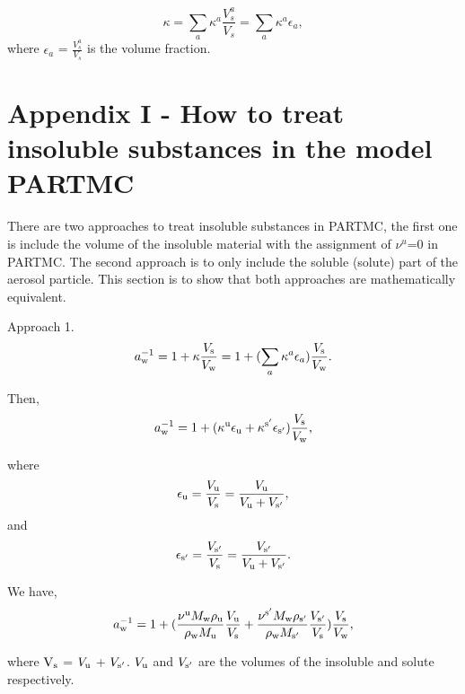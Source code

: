 \documentclass[12pt]{article}
\begin{document}
\begin{equation}\label{eqn:31}
\kappa= \sum_{a} \kappa^{a} \frac {V_{s}^{a}}{V_{s}} = \sum_{a} \kappa^{a} \epsilon_{a},
\end{equation}
where $\epsilon_{a}$ = $ \frac{V_{s}^{a}}{V_{s}}$ is the volume fraction.


\section{Appendix I - How to treat insoluble substances in the model PARTMC}

There are two approaches to treat insoluble substances in PARTMC, the first one is include the volume of the insoluble material with the assignment of $\nu^{u}$=$0$ in PARTMC. The second approach is to only include the soluble (solute) part of the aerosol particle. This section is to show that both approaches are mathematically equivalent.
 
Approach 1. 
\begin{equation}\label{eqn:32}
a_{\rm w}^{-1}=1+\kappa \frac{V_{\rm s}}{V_{\rm w}}=1+ (\sum_{a} \kappa^{a} \epsilon_{a})\frac{V_{\rm s}}{V_{\rm w}}.
\end{equation}

Then,
\begin{equation}\label{eqn:33}
a_{\rm w}^{-1}=1+ (\kappa^{\rm u} \epsilon_{\rm u} +\kappa^{\rm s'} \epsilon_{\rm s'}) \frac{V_{\rm s}}{V_{\rm w}},
\end{equation}

where
\begin{equation}\label{eqn:34}
\epsilon_{\rm u}=\frac{V_{\rm u}}{V_{\rm s}}=\frac{V_{\rm u}}{V_{\rm u}+V_{\rm s'}},
\end{equation}
and
\begin{equation}\label{eqn:35}
\epsilon_{\rm s'}=\frac{V_{\rm s'}}{V_{\rm s}}=\frac{V_{\rm s'}}{V_{\rm u}+V_{\rm s'}}.
\end{equation}

We have,
\begin{equation}\label{eqn:36}
a_{\rm w}^{-1}=1+ (  \frac{\nu^{\rm u} M_{\rm w} \rho_{\rm u}}{\rho_{\rm w}M_{\rm u}} 
\frac{V_{\rm u}}{V_{\rm s}} +
\frac{\nu^{\rm s'} M_{\rm w} \rho_{\rm s'}}{\rho_{\rm w} M_{\rm s'}}    
\frac{V_{\rm s'}}{V_{\rm s}})
\frac{V_{\rm s}}{V_{\rm w}},
\end{equation}

where $\rm V_{\rm s}$ = $ V_{\rm u}$ + $V_{\rm s'}$. $V_{\rm u}$ and $V_{\rm s'}$ are the volumes of the insoluble and solute respectively.
\end{document}
